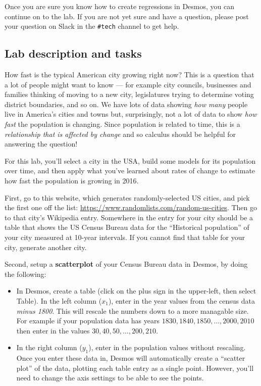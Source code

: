 \documentclass[11pt,letterpaper]{article}
\begin{document}
Once you are sure you know how to create regressions in Desmos, you can continue on to the lab. If you are not yet sure and have a question, please post your question on Slack in the \texttt{\#tech} channel to get help. 

\subsection*{Lab description and tasks}

How fast is the typical American city growing right now? This is a question that a lot of people might want to know --- for example city councils, businesses and families thinking of moving to a new city, legislatures trying to determine voting district boundaries, and so on. We have lots of data showing \textit{how many} people live in America's cities and towns but, surprisingly, not a lot of data to show \textit{how fast} the population is changing. Since population is related to time, this is a \textit{relationship that is affected by change} and so calculus should be helpful for answering the question! 

For this lab, you'll select a city in the USA, build some models for its population over time, and then apply what you've learned about rates of change to estimate how fast the population is growing in 2016. 

First, go to this website, which generates randomly-selected US cities, and pick the first one off the list: \url{https://www.randomlists.com/random-us-cities}. Then go to that city's Wikipedia entry. Somewhere in the entry for your city should be a table that shows the US Census Bureau data for the ``Historical population'' of your city measured at 10-year intervals.  If you cannot find that table for your city, generate another city.

Second, setup a \textbf{scatterplot} of your Census Bureau data in Desmos, by doing the following: 

\begin{itemize}
    \item In Desmos, create a table (click on the plus sign in the upper-left, then select Table). In the left column ($x_1$), enter in the year values from the census data \textit{minus 1800}. This will rescale the numbers down to a more managable size. For example if your population data has years $1830, 1840, 1850, \dots, 2000, 2010$ then enter in the values $30, 40, 50, \dots, 200, 210$. 
    \item In the right column ($y_1$), enter in the population values without rescaling. Once you enter these data in, Desmos will automatically create a ``scatter plot'' of the data, plotting each table entry as a single point. However, you'll need to change the axis settings to be able to see the points. 
\end{itemize}
\end{document}
